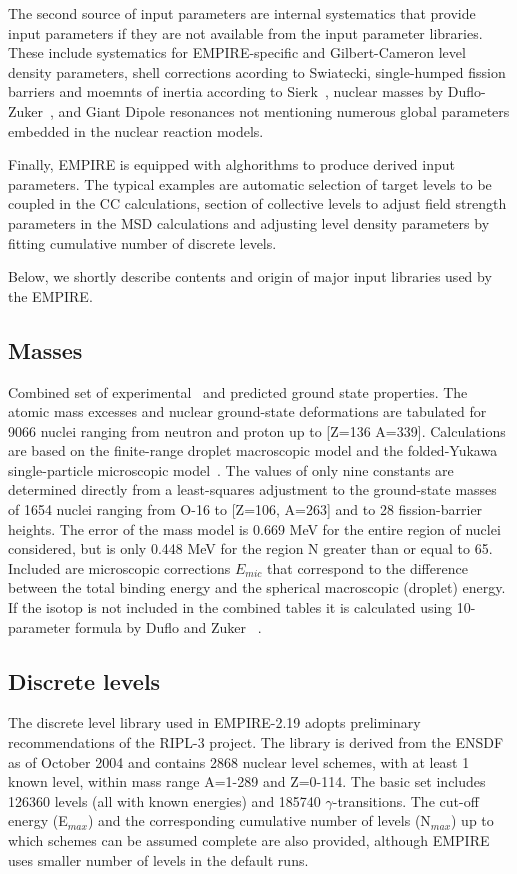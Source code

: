 \documentclass[twocolumn,amsmath,amssymb,10pt,groupedaddress,a4paper]{revtex4}
\begin{document}
The second source of input parameters are internal systematics that provide input parameters if they are not available from the input parameter libraries. These include systematics for EMPIRE-specific and Gilbert-Cameron level density parameters, shell corrections acording to Swiatecki, single-humped fission barriers and moemnts of inertia according to Sierk~\cite{sierk}, nuclear masses by Duflo-Zuker~\cite{Duflo:96}, and Giant Dipole resonances not mentioning numerous global parameters embedded in the nuclear reaction models.

Finally, EMPIRE is equipped with alghorithms to produce derived input parameters. The typical examples are automatic selection of target levels to be coupled in the CC calculations, section of collective levels to adjust field strength parameters in the MSD calculations and adjusting level density parameters by fitting cumulative number of discrete levels.

Below, we shortly describe contents and origin of major input libraries used by the EMPIRE.


\subsection{Masses}
Combined set of experimental~\cite{Audi} and predicted ground state
properties. The atomic mass excesses and nuclear ground-state deformations
are tabulated for 9066 nuclei ranging from neutron and proton up to
{[}Z=136 A=339{]}. Calculations are based on the finite-range droplet
macroscopic model and the folded-Yukawa single-particle microscopic
model~\cite{Moller95}. The values of only nine constants are determined
directly from a least-squares adjustment to the ground-state masses
of 1654 nuclei ranging from O-16 to {[}Z=106, A=263{]} and to 28 fission-barrier
heights. The error of the mass model is 0.669 MeV for the entire region
of nuclei considered, but is only 0.448 MeV for the region N greater
than or equal to 65. Included are microscopic corrections $E_{mic}$
that correspond to the difference between the total binding energy
and the spherical macroscopic (droplet) energy. If the isotop is not included
in the combined tables it is calculated using 10-parameter formula by Duflo and Zuker ~\cite{Duflo:96}.

\subsection{Discrete levels}

The discrete level library used in EMPIRE-2.19 adopts
preliminary recommendations of the RIPL-3 project. The library is derived
from the ENSDF as of October 2004 and contains 2868 nuclear level schemes, with at least
1 known level, within mass range A=1-289 and Z=0-114. The basic set
includes 126360 levels (all with known energies) and 185740 $\gamma$-transitions.
The cut-off energy (E$_{{max}}$) and the corresponding
cumulative number of levels (N$_{{max}}$) up to which schemes can
be assumed complete are also provided, although EMPIRE uses
smaller number of levels in the default runs.
\end{document}
